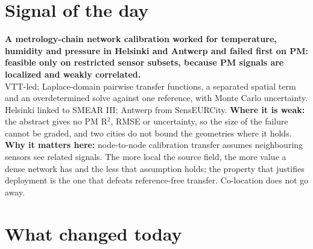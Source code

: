 \documentclass[10pt]{article}
\begin{document}
\vspace{6mm}

\section*{\sffamily\bfseries\color{Deep}Signal of the day}
\vspace{-1.5mm}{\color{Amber}\rule{\linewidth}{1.1pt}}\vspace{2.5mm}

\begin{keybox}
{\sffamily\bfseries\small\color{Deep}A metrology-chain network calibration worked for temperature, humidity and pressure in Helsinki and Antwerp and failed first on PM: feasible only on restricted sensor subsets, because PM signals are localized and weakly correlated.}\\[1.4mm]
\footnotesize
VTT-led; Laplace-domain pairwise transfer functions, a separated spatial term and an overdetermined solve against one reference, with Monte Carlo uncertainty. Helsinki linked to SMEAR III; Antwerp from SensEURCity.
\textbf{Where it is weak:} the abstract gives no PM R$^2$, RMSE or uncertainty, so the size of the failure cannot be graded, and two cities do not bound the geometries where it holds.
\textbf{Why it matters here:} node-to-node calibration transfer assumes neighbouring sensors see related signals. The more local the source field, the more value a dense network has and the less that assumption holds; the property that justifies deployment is the one that defeats reference-free transfer. Co-location does not go away.\par
\end{keybox}

\vspace{3mm}

\section*{\sffamily\bfseries\color{Deep}What changed today}
\vspace{-1.5mm}{\color{Amber}\rule{\linewidth}{1.1pt}}\vspace{2.5mm}
\end{document}
